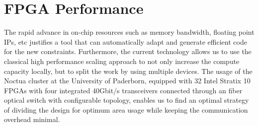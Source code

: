 \section{FPGA Performance}
The rapid advance in on-chip resources such as memory bandwidth, floating point IPs, etc justifies a tool that can automatically adapt and generate efficient code for the new constraints. Furthermore, the current technology allows us to use the classical high performance scaling approach to not only increase the compute capacity locally, but to split the work by using multiple devices. The usage of the Noctua cluster at the University of Paderborn, equipped with 32 Intel Stratix 10 FPGAs \cite{label46} with four integrated 40Gbit/s transceivers connected through an fiber optical switch with configurable topology, enables us to find an optimal strategy of dividing the design for optimum area usage while keeping the communication overhead minimal.




